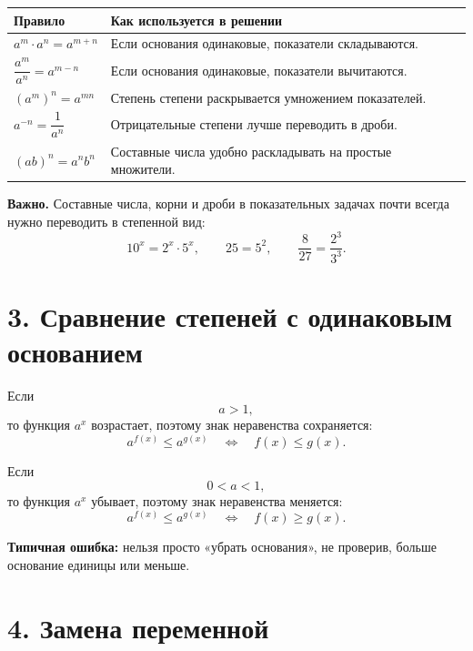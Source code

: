 \documentclass[a4paper,12pt]{article}
\newcommand{\sectionline}{\vspace{2mm}{\color{linegray}\hrule height 0.5pt}\vspace{2mm}}
\newcommand{\important}[1]{\textcolor{darkaccent}{\textbf{#1}}}
\begin{document}
\begin{center}
\renewcommand{\arraystretch}{1.45}
\begin{tabularx}{\linewidth}{@{}>{\bfseries}lX@{}}
\toprule
Правило & Как используется в решении \\
\midrule
$a^m\cdot a^n=a^{m+n}$ &
Если основания одинаковые, показатели складываются. \\

$\dfrac{a^m}{a^n}=a^{m-n}$ &
Если основания одинаковые, показатели вычитаются. \\

$(a^m)^n=a^{mn}$ &
Степень степени раскрывается умножением показателей. \\

$a^{-n}=\dfrac1{a^n}$ &
Отрицательные степени лучше переводить в дроби. \\

$(ab)^n=a^n b^n$ &
Составные числа удобно раскладывать на простые множители. \\
\bottomrule
\end{tabularx}
\end{center}

\important{Важно.} Составные числа, корни и дроби в показательных задачах почти всегда нужно переводить в степенной вид:
\[
10^x=2^x\cdot5^x,\qquad
25=5^2,\qquad
\frac{8}{27}=\frac{2^3}{3^3}.
\]

\sectionline

\section*{\textcolor{darkaccent}{3. Сравнение степеней с одинаковым основанием}}

Если
\[
a>1,
\]
то функция $a^x$ возрастает, поэтому знак неравенства сохраняется:
\[
a^{f(x)}\le a^{g(x)}
\quad\Longleftrightarrow\quad
f(x)\le g(x).
\]

Если
\[
0<a<1,
\]
то функция $a^x$ убывает, поэтому знак неравенства меняется:
\[
a^{f(x)}\le a^{g(x)}
\quad\Longleftrightarrow\quad
f(x)\ge g(x).
\]

\important{Типичная ошибка:} нельзя просто «убрать основания», не проверив, больше основание единицы или меньше.

\sectionline

\section*{\textcolor{darkaccent}{4. Замена переменной}}
\end{document}
